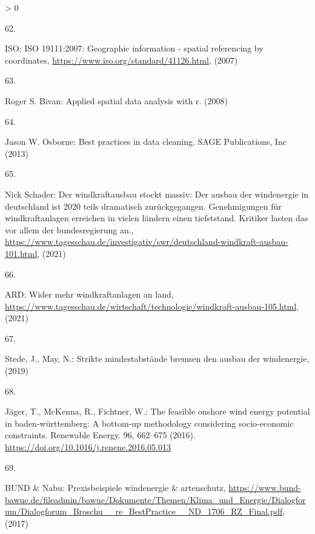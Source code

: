 \documentclass[a4paper,11pt]{article}
\newlength{\cslhangindent}
\newlength{\csllabelwidth}
\newenvironment{CSLReferences}[3] %
 {%
  \setlength{\parindent}{0pt}
  \ifodd #1 \everypar{\setlength{\hangindent}{\cslhangindent}}\ignorespaces\fi
  \ifnum #2 > 0
  \setlength{\parskip}{#2\baselineskip}
  \fi
 }%
 {}
\newcommand{\CSLLeftMargin}[1]{\parbox[t]{\maxof{\widthof{#1}}{\csllabelwidth}}{#1}}
\newcommand{\CSLRightInline}[1]{\parbox[t]{\linewidth}{#1}}
\begin{document}
\begin{CSLReferences}{0}{0}
\leavevmode\hypertarget{ref-ISO.2007}{}%
\CSLLeftMargin{62. }
\CSLRightInline{ISO: ISO 19111:2007: Geographic information - spatial referencing by coordinates, \url{https://www.iso.org/standard/41126.html}, (2007)}

\leavevmode\hypertarget{ref-RogerS.Bivan.2008}{}%
\CSLLeftMargin{63. }
\CSLRightInline{Roger S. Bivan: Applied spatial data analysis with r. (2008)}

\leavevmode\hypertarget{ref-JasonW.Osborne.2013}{}%
\CSLLeftMargin{64. }
\CSLRightInline{Jason W. Osborne: Best practices in data cleaning. {SAGE Publications, Inc} (2013)}

\leavevmode\hypertarget{ref-NickSchader.2021}{}%
\CSLLeftMargin{65. }
\CSLRightInline{Nick Schader: Der windkraftausbau stockt massiv: Der ausbau der windenergie in deutschland ist 2020 teils dramatisch zur{ü}ckgegangen. Genehmigungen f{ü}r windkraftanlagen erreichen in vielen l{ä}ndern einen tiefststand. Kritiker lasten das vor allem der bundesregierung an., \url{https://www.tagesschau.de/investigativ/swr/deutschland-windkraft-ausbau-101.html}, (2021)}

\leavevmode\hypertarget{ref-ARD.2021}{}%
\CSLLeftMargin{66. }
\CSLRightInline{ARD: Wider mehr windkraftanlagen an land, \url{https://www.tagesschau.de/wirtschaft/technologie/windkraft-ausbau-105.html}, (2021)}

\leavevmode\hypertarget{ref-Stede.2019}{}%
\CSLLeftMargin{67. }
\CSLRightInline{Stede, J., May, N.: Strikte mindestabst{ä}nde bremsen den ausbau der windenergie, (2019)}

\leavevmode\hypertarget{ref-Jager.2016}{}%
\CSLLeftMargin{68. }
\CSLRightInline{Jäger, T., McKenna, R., Fichtner, W.: The feasible onshore wind energy potential in baden-w{ü}rttemberg: A bottom-up methodology considering socio-economic constraints. Renewable Energy. 96, 662--675 (2016). \url{https://doi.org/10.1016/j.renene.2016.05.013}}

\leavevmode\hypertarget{ref-BUNDux5cux26Nabu.2017}{}%
\CSLLeftMargin{69. }
\CSLRightInline{BUND \& Nabu: Prexisbeispiele windenergie {\&} artenschutz, \url{https://www.bund-bawue.de/fileadmin/bawue/Dokumente/Themen/Klima_und_Energie/Dialogforum/Dialogforum_Broschu__re_BestPractice__ND_1706_RZ_Final.pdf}, (2017)}

\end{CSLReferences}
\indent
\setlength{\parindent}{17pt}
\setlength{\leftskip}{0pt}
\setlength{\parskip}{0pt}

\newpage

\appendix
\end{document}
